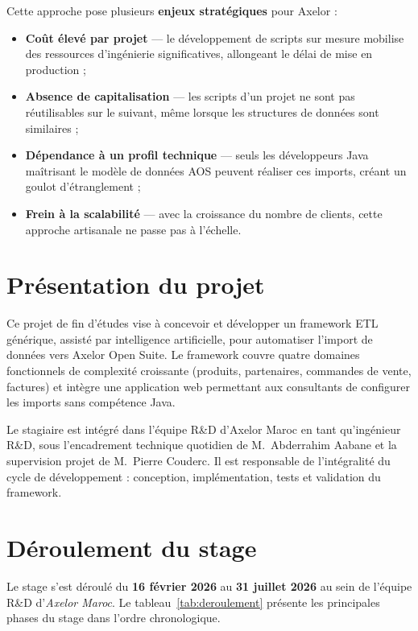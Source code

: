 Cette approche pose plusieurs \textbf{enjeux stratégiques} pour Axelor :
\begin{itemize}
    \item \textbf{Coût élevé par projet} — le développement de scripts sur mesure mobilise des ressources d'ingénierie significatives, allongeant le délai de mise en production ;
    \item \textbf{Absence de capitalisation} — les scripts d'un projet ne sont pas réutilisables sur le suivant, même lorsque les structures de données sont similaires ;
    \item \textbf{Dépendance à un profil technique} — seuls les développeurs Java maîtrisant le modèle de données AOS peuvent réaliser ces imports, créant un goulot d'étranglement ;
    \item \textbf{Frein à la scalabilité} — avec la croissance du nombre de clients, cette approche artisanale ne passe pas à l'échelle.
\end{itemize}

\section{Présentation du projet}
\label{sec:presentation-projet}

Ce projet de fin d'études vise à concevoir et développer un framework ETL générique, assisté par intelligence artificielle, pour automatiser l'import de données vers Axelor Open Suite. Le framework couvre quatre domaines fonctionnels de complexité croissante (produits, partenaires, commandes de vente, factures) et intègre une application web permettant aux consultants de configurer les imports sans compétence Java.

Le stagiaire est intégré dans l'équipe R\&D d'Axelor Maroc en tant qu'ingénieur R\&D, sous l'encadrement technique quotidien de M.~Abderrahim Aabane et la supervision projet de M.~Pierre Couderc. Il est responsable de l'intégralité du cycle de développement : conception, implémentation, tests et validation du framework.

\section{Déroulement du stage}
\label{sec:deroulement}

Le stage s'est déroulé du \textbf{16 février 2026} au \textbf{31 juillet 2026} au sein de l'équipe R\&D d'\textit{Axelor Maroc}.
Le tableau~\ref{tab:deroulement} présente les principales phases du stage dans l'ordre chronologique.

